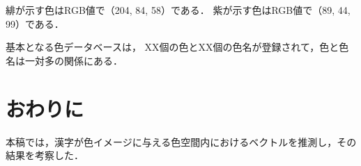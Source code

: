 \documentclass[a4j,twocolumn]{ujarticle} %
\begin{document}
緋が示す色はRGB値で（204, 84, 58）である．
紫が示す色はRGB値で（89, 44, 99）である．


基本となる色データベースは，
XX個の色とXX個の色名が登録されて，色と色名は一対多の関係にある．

\section{おわりに}

本稿では，漢字が色イメージに与える色空間内におけるベクトルを推測し，その結果を考察した．




\end{document}
